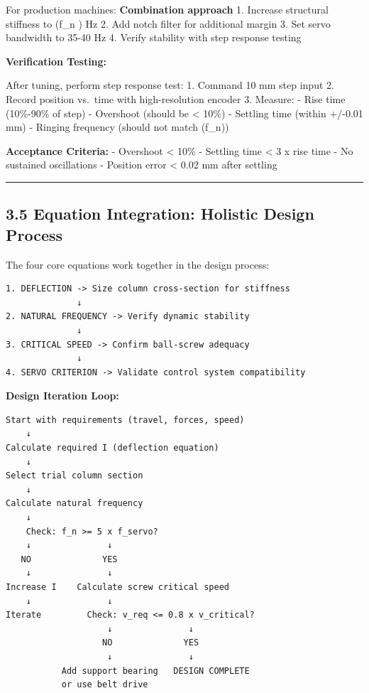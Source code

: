 \documentclass[
]{article}
\begin{document}
For production machines: \textbf{Combination approach} 1. Increase
structural stiffness to (f\_n ) Hz 2. Add notch filter for
additional margin 3. Set servo bandwidth to 35-40 Hz 4. Verify stability
with step response testing

\textbf{Verification Testing:}

After tuning, perform step response test: 1. Command 10 mm step input 2.
Record position vs.~time with high-resolution encoder 3. Measure: - Rise
time (10\%-90\% of step) - Overshoot (should be \textless{} 10\%) -
Settling time (within +/-0.01 mm) - Ringing frequency (should not match
(f\_n))

\textbf{Acceptance Criteria:} - Overshoot \textless{} 10\% - Settling
time \textless{} 3 x rise time - No sustained oscillations - Position
error \textless{} 0.02 mm after settling

\begin{center}\rule{0.5\linewidth}{0.5pt}\end{center}

\subsection{3.5 Equation Integration: Holistic Design
Process}\label{equation-integration-holistic-design-process}

The four core equations work together in the design process:

\begin{verbatim}
1. DEFLECTION -> Size column cross-section for stiffness
              ↓
2. NATURAL FREQUENCY -> Verify dynamic stability
              ↓
3. CRITICAL SPEED -> Confirm ball-screw adequacy
              ↓
4. SERVO CRITERION -> Validate control system compatibility
\end{verbatim}

\textbf{Design Iteration Loop:}

\begin{verbatim}
Start with requirements (travel, forces, speed)
    ↓
Calculate required I (deflection equation)
    ↓
Select trial column section
    ↓
Calculate natural frequency
    ↓
    Check: f_n >= 5 x f_servo?
    ↓               ↓
   NO              YES
    ↓               ↓
Increase I    Calculate screw critical speed
    ↓               ↓
Iterate         Check: v_req <= 0.8 x v_critical?
                    ↓               ↓
                   NO              YES
                    ↓               ↓
           Add support bearing   DESIGN COMPLETE
           or use belt drive
\end{verbatim}
\end{document}
